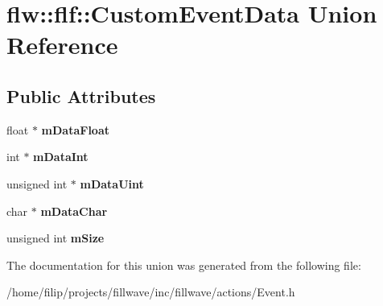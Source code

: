 \hypertarget{unionflw_1_1flf_1_1CustomEventData}{}\section{flw\+:\+:flf\+:\+:Custom\+Event\+Data Union Reference}
\label{unionflw_1_1flf_1_1CustomEventData}
\subsection*{Public Attributes}
\begin{DoxyCompactItemize}
\item 
\mbox{\label{unionflw_1_1flf_1_1CustomEventData_a9ec3e1ff6905cfdc4c0ee682da298be6}} 
float $\ast$ {\bfseries m\+Data\+Float}
\item 
\mbox{\label{unionflw_1_1flf_1_1CustomEventData_a8798f210ea0d9436c6c9a35c5c356037}} 
int $\ast$ {\bfseries m\+Data\+Int}
\item 
\mbox{\label{unionflw_1_1flf_1_1CustomEventData_ad8d76d7d1c890eee56cb034236b62d06}} 
unsigned int $\ast$ {\bfseries m\+Data\+Uint}
\item 
\mbox{\label{unionflw_1_1flf_1_1CustomEventData_ac65cefefdfedd4b3e6ab4b897b0ed824}} 
char $\ast$ {\bfseries m\+Data\+Char}
\item 
\mbox{\label{unionflw_1_1flf_1_1CustomEventData_a5d0af4e9c9fbe37714eb6c190ed1120f}} 
unsigned int {\bfseries m\+Size}
\end{DoxyCompactItemize}


The documentation for this union was generated from the following file\+:\begin{DoxyCompactItemize}
\item 
/home/filip/projects/fillwave/inc/fillwave/actions/Event.\+h\end{DoxyCompactItemize}
